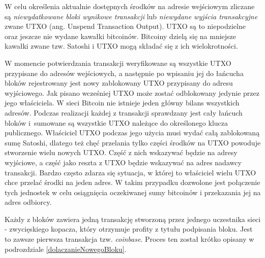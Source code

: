 \documentclass[12pt, twoside, final, openany]{mgr}
\begin{document}
\indent W celu określenia aktualnie dostępnych środków na adresie wejściowym zliczane są \textit{niewydatkowane bloki wynikowe transakcji} lub \textit{niewydane wyjścia transakcyjne} zwane UTXO (ang. Unspend Transaction Output). UTXO są to niepodzielne oraz jeszcze nie wydane kawałki bitcoinów. Bitcoiny dzielą się na mniejsze kawałki zwane tzw. Satoshi i UTXO mogą składać się z ich wielokrotności. 

\indent W momencie potwierdzania transakcji weryfikowane są wszystkie UTXO przypisane do adresów wejściowych, a następnie po wpisaniu jej do łańcucha bloków rejestrowany jest nowy zablokowany UTXO przypisany do adresu wyjściowego. Jak pisano wcześniej UTXO może zostać odblokowany jedynie przez jego właściciela. W sieci Bitcoin nie istnieje jeden główny bilans wszystkich adresów. Podczas realizacji każdej z transakcji sprawdzany jest cały łańcuch bloków i~sumowane są wszystkie UTXO należące do określonego klucza publicznego. Właściciel UTXO podczas jego użycia musi wydać całą zablokowaną sumę Satoshi, dlatego też chęć przelania tylko części środków na UTXO powoduje stworzenie wielu nowych UTXO. Część z nich wskazywać będzie na adresy wyjściowe, a część jako reszta z UTXO będzie wskazywać na adres nadawcy transakcji. Bardzo często zdarza się sytuacja, w której to właściciel wielu UTXO chce przelać środki na jeden adres. W takim przypadku dozwolone jest połączenie tych jednostek w celu osiągnięcia oczekiwanej sumy bitcoinów i przekazania jej na adres odbiorcy. 

\indent Każdy z bloków zawiera jedną transakcję stworzoną przez jednego uczestnika sieci - zwycięskiego kopacza, który otrzymuje profity z tytułu podpisania bloku. Jest to zawsze pierwsza transakcja tzw. \textit{coinbase}. Proces ten został krótko opisany w podrozdziale \ref{dolaczanieNowegoBloku}.
\end{document}
